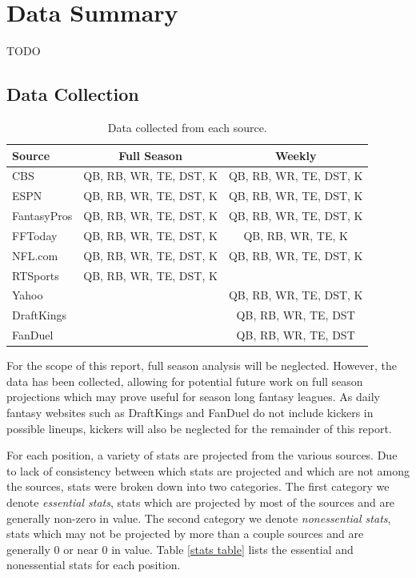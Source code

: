 \documentclass[12pt]{article}
\begin{document}
\pagebreak
\section{Data Summary}
TODO


\subsection{Data Collection}
\begin{table}[H]
\caption{Data collected from each source.}
\small
\label{sources}
\centering
\begin{tabular}{lcc}
	\toprule
	Source        &  Full Season              &  Weekly \\
	\midrule
	CBS           &  QB, RB, WR, TE, DST, K   &   QB, RB, WR, TE, DST, K \\
	ESPN          &  QB, RB, WR, TE, DST, K   &   QB, RB, WR, TE, DST, K \\
	FantasyPros   &  QB, RB, WR, TE, DST, K   &   QB, RB, WR, TE, DST, K \\
	FFToday       &  QB, RB, WR, TE, DST, K   &   QB, RB, WR, TE, K \\
	NFL.com       &  QB, RB, WR, TE, DST, K   &   QB, RB, WR, TE, DST, K \\
	RTSports      &  QB, RB, WR, TE, DST, K   &    {} \\
	Yahoo         &  {}                       &   QB, RB, WR, TE, DST, K \\
	\midrule
	DraftKings    &  {}                       &   QB, RB, WR, TE, DST \\
 	FanDuel       &  {}                       &   QB, RB, WR, TE, DST \\
	\bottomrule
\end{tabular}
\end{table}

For the scope of this report, full season analysis will be neglected. However, the data has been collected, allowing for potential future work on full season projections which may prove useful for season long fantasy leagues. As daily fantasy websites such as DraftKings and FanDuel do not include kickers in possible lineups, kickers will also be neglected for the remainder of this report.\bigskip

For each position, a variety of stats are projected from the various sources. Due to lack of consistency between which stats are projected and which are not among the sources, stats were broken down into two categories. The first category we denote \textit{essential stats}, stats which are projected by most of the sources and are generally non-zero in value. The second category we denote \textit{nonessential stats}, stats which may not be projected by more than a couple sources and are generally 0 or near 0 in value. Table \ref{stats table} lists the essential and nonessential stats for each position.
\end{document}
